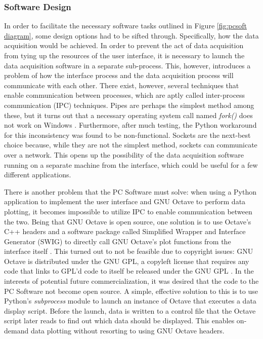 \subsubsection[Software Design]{Software Design}
In order to facilitate the necessary software tasks outlined in Figure \ref{fig:pcsoft diagram}, 
some design options had to be sifted through. Specifically, how the data acquisition would be 
achieved. In order to prevent the act of data acquisition from tying up the resources of the user 
interface, it is necessary to launch the data acquisition software in a separate sub-process. 
This, however, introduces a problem of how the interface process and the data acquisition process
will communicate with each other. There exist, however, several techniques that enable communication
between processes, which are aptly called inter-process communication (IPC) techniques. Pipes are 
perhaps the simplest method among these, but it turns out that a necessary operating system call named 
\textit{fork()} does not work on Windows \cite{web:windowsfork}. Furthermore, after much testing, 
the Python workaround for this inconsistency was found to be non-functional. Sockets are the next-best
choice because, while they are not the simplest method, sockets can communicate over a network. This
opens up the possibility of the data acquisition software running on a separate machine from the 
interface, which could be useful for a few different applications.

There is another problem that the PC Software must solve: when using a Python application to implement
the user interface and GNU Octave to perform data plotting, it becomes impossible to utilize IPC to
enable communication between the two. Being that GNU Octave is open source, one solution is to use Octave's
C++ headers and a software package called Simplified Wrapper and Interface Generator (SWIG) to directly call 
GNU Octave's plot functions from the interface itself \cite{web:swig}. This turned out to not be feasible 
due to copyright issues: GNU Octave is distributed under the GNU GPL, a copyleft license that requires 
any code that links to GPL'd code to itself be released under the GNU GPL \cite{web:gnugpl}. In the interests of potential 
future commercialization, it was desired that the code to the PC Software not become open source. A simple, 
effective solution to this is to use Python's \textit{subprocess} module to launch an instance of Octave 
that executes a data display script. Before the launch, data is written to a control file that the Octave
 script later reads to find out which data should be displayed. This enables on-demand data plotting without 
resorting to using GNU Octave headers.

